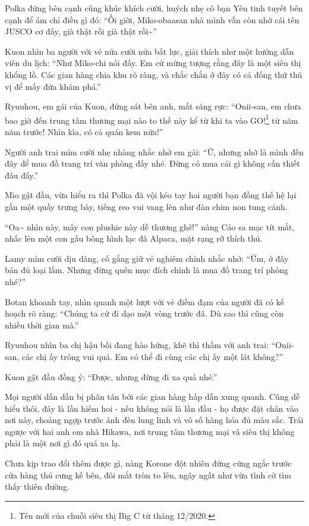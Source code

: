 \documentclass[../main.tex]{subfiles}
\begin{document}
Polka đứng bên cạnh cũng khúc khích cười, huých nhẹ cô bạn Yêu tinh tuyết bên cạnh để ám chỉ điều gì đó: ``Ối giời, Miko-obaasan nhà mình vẫn còn nhớ cái tên JUSCO cơ đấy, già thật rồi già thật rồi\~{}''

Kuon nhìn ba người với vẻ nửa cười nửa bất lực, giải thích như một hướng dẫn viên du lịch: ``Như Miko-chi nói đấy. Em cứ mừng tượng rằng đây là một siêu thị khổng lồ. Các gian hàng chia khu rõ ràng, và chắc chắn ở đây có cả đống thứ thú vị để mấy đứa khám phá.''

Ryuuhou, em gái của Kuon, đứng sát bên anh, mắt sáng rực: ``Onii-san, em chưa bao giờ đến trung tâm thương mại nào to thế này kể từ khi ta vào GO!\footnote{Tên mới của chuỗi siêu thị Big C từ tháng 12/2020.} từ năm năm trước! Nhìn kìa, có cả quán kem nữa!''

Người anh trai mỉm cười nhẹ nhàng nhắc nhở em gái: ``Ừ, nhưng nhớ là mình đến đây để mua đồ trang trí văn phòng đấy nhé. Đừng có mua cái gì không cần thiết đâu đấy.''

Mio gật đầu, vừa hiểu ra thì Polka đã vội kéo tay hai người bạn đồng thế hệ lại gần một quầy trưng bày, tiếng reo vui vang lên như đàn chim non tung cánh.

``Oa\~{} nhìn này, mấy con plushie này dễ thương ghê!'' nàng Cáo sa mạc tít mắt, nhấc lên một con gấu bông hình lạc đà Alpaca, mặt rạng rỡ thích thú.

Lamy mỉm cười dịu dàng, cố gắng giữ vẻ nghiêm chỉnh nhắc nhở: ``Ừm, ở đây bán đủ loại lắm. Nhưng đừng quên mục đích chính là mua đồ trang trí phòng nhé?''

Botan khoanh tay, nhìn quanh một lượt với vẻ điềm đạm của người đã có kế hoạch rõ ràng: ``Chúng ta cứ đi dạo một vòng trước đã. Dù sao thì cũng còn nhiều thời gian mà.''

Ryuuhou nhìn ba chị hậu bối đang hào hứng, khẽ thì thầm với anh trai: ``Onii-san, các chị ấy trông vui quá. Em có thể đi cùng các chị ấy một lát không?''

Kuon gật đầu đồng ý: ``Được, nhưng đừng đi xa quá nhé.''

Mọi người dần dần bị phân tán bởi các gian hàng hấp dẫn xung quanh. Cũng dễ hiểu thôi, đây là lần hiếm hoi - nếu không nói là lần đầu - họ được đặt chân vào nơi này, choáng ngợp trước ánh đèn lung linh và vô số hàng hóa đủ màu sắc. Trái ngược với hai anh em nhà Hikawa, nơi trung tâm thương mại và siêu thị không phải là một nơi gì đó quá xa lạ.

Chưa kịp trao đổi thêm được gì, nàng Korone đột nhiên đứng cứng ngắc trước cửa hàng thú cưng kế bên, đôi mắt tròn to lên, ngây ngất như vừa tình cờ tìm thấy thiên đường.
\end{document}
